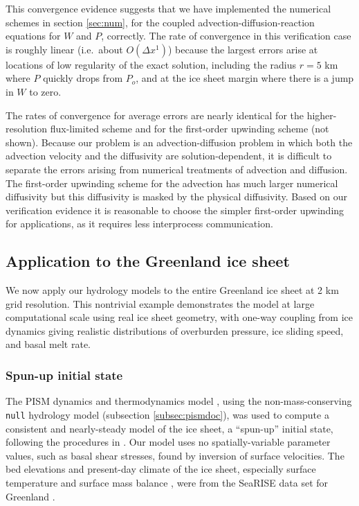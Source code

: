 \documentclass[gmd]{copernicus}   %
\begin{document}
This convergence evidence suggests that we have implemented the numerical schemes in section \ref{sec:num}, for the coupled advection-diffusion-reaction equations for $W$ and $P$, correctly.  The rate of convergence in this verification case is roughly linear (i.e.~about $O(\Delta x^1)$) because the largest errors arise at locations of low regularity of the exact solution, including the radius $r=5$ km where $P$ quickly drops from $P_o$, and at the ice sheet margin where there is a jump in $W$ to zero.

The rates of convergence for average errors are nearly identical for the higher-resolution flux-limited scheme and for the first-order upwinding scheme (not shown).  Because our problem is an advection-diffusion problem in which both the advection velocity and the diffusivity are solution-dependent, it is difficult to separate the errors arising from numerical treatments of advection and diffusion.  The first-order upwinding scheme for the advection has much larger numerical diffusivity but this diffusivity is masked by the physical diffusivity.  Based on our verification evidence it is reasonable to choose the simpler first-order upwinding for applications, as it requires less interprocess communication.


\subsection{Application to the Greenland ice sheet}

We now apply our hydrology models to the entire Greenland ice sheet at 2 km grid resolution.  This nontrivial example demonstrates the model at large computational scale using real ice sheet geometry, with one-way coupling from ice dynamics giving realistic distributions of overburden pressure, ice sliding speed, and basal melt rate.

\subsubsection{Spun-up initial state}  The PISM dynamics and thermodynamics model \citep{BBssasliding,Winkelmannetal2011,AschwandenBuelerKhroulevBlatter}, using the non-mass-conserving \texttt{null} hydrology model (subsection \ref{subsec:pismdoc}), was used to compute a consistent and nearly-steady model of the ice sheet, a ``spun-up'' initial state, following the procedures in \cite{AschwandenAdalgeirsdottirKhroulev}.  Our model uses no spatially-variable parameter values, such as basal shear stresses, found by inversion of surface velocities.  The bed elevations and present-day climate of the ice sheet, especially surface temperature and surface mass balance \citep{Ettemaetal2009}, were from the SeaRISE data set for Greenland \citep{Bindschadler2013SeaRISE}.
\end{document}

